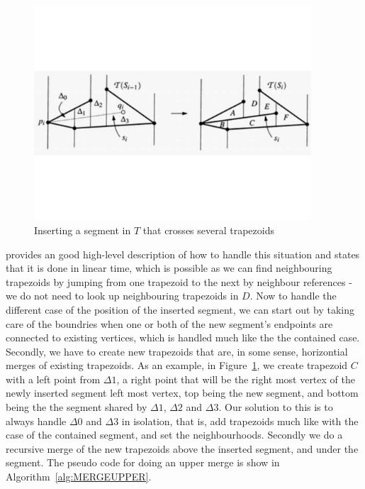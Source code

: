\begin{figure}[t]
    \centering
      \includegraphics[height=80mm]{images/intersecting_segments.pdf}
    \caption{Inserting a segment in $T$ that crosses several trapezoids}
    \label{fig:intersecting_segments}
\end{figure}

\cite{computational_geometry} provides an good high-level description of how to handle this situation and states that it is done in linear time, which is possible as we can find neighbouring trapezoids by jumping from one trapezoid to the next by neighbour references - we do not need to look up neighbouring trapezoids in $D$. Now to handle the different case of the position of the inserted segment, we can start out by taking care of the boundries when one or both of the new segment's endpoints are connected to existing vertices, which is handled much like the the contained case. Secondly, we have to create new trapezoids that are, in some sense, horizontial merges of existing trapezoids. As an example, in Figure~\ref{fig:intersecting_segments}, we create  trapezoid $C$ with a left point from $\Delta 1$, a right point that will be the right most vertex of the newly inserted segment left most vertex, top being the new segment, and bottom being the the segment shared by  $\Delta 1$,  $\Delta 2$ and  $\Delta 3$.  Our solution to this is to always handle $\Delta 0$ and $\Delta 3$ in isolation, that is, add trapezoids much like with the case of the contained segment, and set the neighbourhoods. Secondly we do a recursive merge of the new trapezoids above the inserted segment, and under the segment. The pseudo code for doing an upper merge is show in Algorithm~\ref{alg:MERGEUPPER}.


